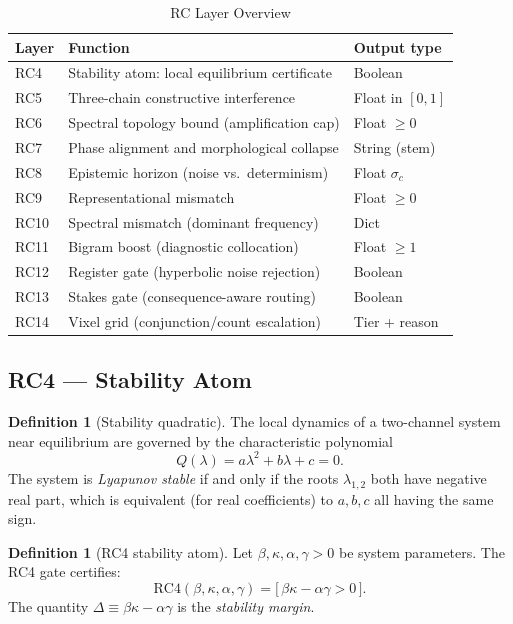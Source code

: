 \documentclass[12pt,a4paper]{article}
\theoremstyle{plain}
\theoremstyle{definition}
\newtheorem{definition}[theorem]{Definition}
\theoremstyle{remark}
\begin{document}
\begin{table}[H]
\centering
\caption{RC Layer Overview}
\label{tab:rc-overview}
\renewcommand{\arraystretch}{1.25}
\begin{tabularx}{\linewidth}{lXl}
\toprule
\textbf{Layer} & \textbf{Function} & \textbf{Output type} \\
\midrule
RC4  & Stability atom: local equilibrium certificate & Boolean \\
RC5  & Three-chain constructive interference & Float in $[0,1]$ \\
RC6  & Spectral topology bound (amplification cap) & Float $\geq 0$ \\
RC7  & Phase alignment and morphological collapse & String (stem) \\
RC8  & Epistemic horizon (noise vs.\ determinism) & Float $\sigma_c$ \\
RC9  & Representational mismatch & Float $\geq 0$ \\
RC10 & Spectral mismatch (dominant frequency) & Dict \\
RC11 & Bigram boost (diagnostic collocation) & Float $\geq 1$ \\
RC12 & Register gate (hyperbolic noise rejection) & Boolean \\
RC13 & Stakes gate (consequence-aware routing) & Boolean \\
RC14 & Vixel grid (conjunction/count escalation) & Tier + reason \\
\bottomrule
\end{tabularx}
\end{table}

\subsection{RC4 --- Stability Atom}
\label{sec:rc4}

\begin{definition}[Stability quadratic]
The local dynamics of a two-channel system near equilibrium are
governed by the characteristic polynomial
\begin{equation}
Q(\lambda) = a\lambda^2 + b\lambda + c = 0.
\label{eq:stability-quadratic}
\end{equation}
The system is \emph{Lyapunov stable} if and only if the roots
$\lambda_{1,2}$ both have negative real part, which is equivalent
(for real coefficients) to $a,b,c$ all having the same sign.
\end{definition}

\begin{definition}[RC4 stability atom]
Let $\beta, \kappa, \alpha, \gamma > 0$ be system parameters.
The RC4 gate certifies:
\begin{equation}
\mathrm{RC}4(\beta,\kappa,\alpha,\gamma) =
\bigl[\,\beta\kappa - \alpha\gamma > 0\,\bigr].
\label{eq:rc4}
\end{equation}
The quantity $\Delta \equiv \beta\kappa - \alpha\gamma$ is the
\emph{stability margin}.
\end{definition}
\end{document}
